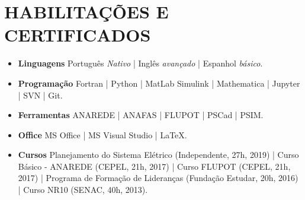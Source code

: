 \documentclass[11pt,a4paper,sans]{moderncv}
\begin{document}
\section{HABILITAÇÕES E CERTIFICADOS}
\begin{itemize}
	
	\item \textbf{Linguagens} Português \textit{Nativo} | Inglês \textit{avançado} | Espanhol \textit{básico}.\vspace{-0.15cm}
	
	\item \textbf{Programação} Fortran | Python | MatLab Simulink | Mathematica | Jupyter | SVN | Git.\vspace{-0.15cm}
	
	\item \textbf{Ferramentas} ANAREDE | ANAFAS | FLUPOT | PSCad | PSIM.\vspace{-0.15cm}
	
	\item \textbf{Office} MS Office | MS Visual Studio | \LaTeX. \vspace{-0.15cm} 
	
	\item \textbf{Cursos} Planejamento do Sistema Elétrico (Independente, 27h, 2019) | Curso Básico - ANAREDE (CEPEL, 21h, 2017) | Curso FLUPOT (CEPEL, 21h, 2017) | Programa de Formação de Lideranças (Fundação Estudar, 20h, 2016) | Curso NR10 (SENAC, 40h, 2013).
	
\end{itemize}
\end{document}
